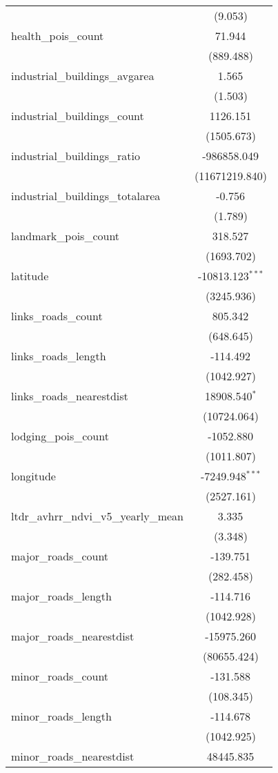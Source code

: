 \begin{table}[!htbp]
\begin{tabular}{@{\extracolsep{5pt}}lc}
  & (9.053) \\
 health_pois_count & 71.944$^{}$ \\
  & (889.488) \\
 industrial_buildings_avgarea & 1.565$^{}$ \\
  & (1.503) \\
 industrial_buildings_count & 1126.151$^{}$ \\
  & (1505.673) \\
 industrial_buildings_ratio & -986858.049$^{}$ \\
  & (11671219.840) \\
 industrial_buildings_totalarea & -0.756$^{}$ \\
  & (1.789) \\
 landmark_pois_count & 318.527$^{}$ \\
  & (1693.702) \\
 latitude & -10813.123$^{***}$ \\
  & (3245.936) \\
 links_roads_count & 805.342$^{}$ \\
  & (648.645) \\
 links_roads_length & -114.492$^{}$ \\
  & (1042.927) \\
 links_roads_nearestdist & 18908.540$^{*}$ \\
  & (10724.064) \\
 lodging_pois_count & -1052.880$^{}$ \\
  & (1011.807) \\
 longitude & -7249.948$^{***}$ \\
  & (2527.161) \\
 ltdr_avhrr_ndvi_v5_yearly_mean & 3.335$^{}$ \\
  & (3.348) \\
 major_roads_count & -139.751$^{}$ \\
  & (282.458) \\
 major_roads_length & -114.716$^{}$ \\
  & (1042.928) \\
 major_roads_nearestdist & -15975.260$^{}$ \\
  & (80655.424) \\
 minor_roads_count & -131.588$^{}$ \\
  & (108.345) \\
 minor_roads_length & -114.678$^{}$ \\
  & (1042.925) \\
 minor_roads_nearestdist & 48445.835$^{}$ \\

\end{tabular}
\end{table}
